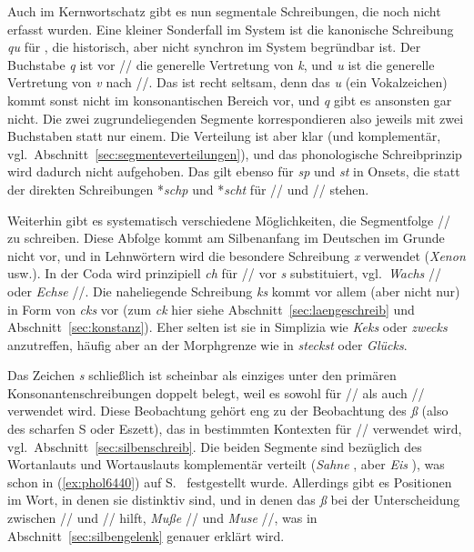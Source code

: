 Auch im Kernwortschatz gibt es nun segmentale Schreibungen, die noch nicht erfasst wurden.
Eine kleiner Sonderfall im System ist die kanonische Schreibung \textit{qu} für \textipa{[kv]}, die historisch, aber nicht synchron im System begründbar ist.
Der Buchstabe \textit{q} ist vor // die generelle Vertretung von \textit{k}, und \textit{u} ist die generelle Vertretung von \textit{v} nach //.
Das ist recht seltsam, denn das \textit{u} (ein Vokalzeichen) kommt sonst nicht im konsonantischen Bereich vor, und \textit{q} gibt es ansonsten gar nicht.
Die zwei zugrundeliegenden Segmente korrespondieren also jeweils mit zwei Buchstaben statt nur einem.
Die Verteilung ist aber klar (und komplementär, vgl.\ Abschnitt~\ref{sec:segmenteverteilungen}), und das phonologische Schreibprinzip wird dadurch nicht aufgehoben.
Das gilt ebenso für \textit{sp} und \textit{st} in Onsets, die statt der direkten Schreibungen *\textit{schp} und *\textit{scht} für // und // stehen.

Weiterhin gibt es systematisch verschiedene Möglichkeiten, die Segmentfolge // zu schreiben.
Diese Abfolge kommt am Silbenanfang im Deutschen im Grunde nicht vor, und in Lehnwörtern wird die besondere Schreibung \textit{x} verwendet (\textit{Xenon} usw.).
In der Coda wird prinzipiell \textit{ch} für // vor \textit{s} substituiert, vgl.\ \textit{Wachs} // oder \textit{Echse} //.
Die naheliegende Schreibung \textit{ks} kommt vor allem (aber nicht nur) in Form von \textit{cks} vor (zum \textit{ck} hier siehe Abschnitt~\ref{sec:laengeschreib} und Abschnitt~\ref{sec:konstanz}).
Eher selten ist sie in Simplizia wie \textit{Keks} oder \textit{zwecks} anzutreffen, häufig aber an der Morphgrenze wie in \textit{steckst} oder \textit{Glücks}.

Das Zeichen \textit{s} schließlich ist scheinbar als einziges unter den primären Konsonantenschreibungen doppelt belegt, weil es sowohl für // als auch // verwendet wird.
Diese Beobachtung gehört eng zu der Beobachtung des \textit{ß} (also des scharfen S oder Eszett), das in bestimmten Kontexten für // verwendet wird, vgl.\ Abschnitt~\ref{sec:silbenschreib}.
Die beiden Segmente sind bezüglich des Wortanlauts und Wortauslauts komplementär verteilt (\textit{Sahne} \textipa{[za:n@]}, aber \textit{Eis} \textipa{[P\t{aE}s]}), was schon in (\ref{ex:phol6440}) auf S.~\pageref{ex:phol6440} festgestellt wurde.
Allerdings gibt es Positionen im Wort, in denen sie distinktiv sind, und in denen das \textit{ß} bei der Unterscheidung zwischen // und // hilft, \zB \textit{Muße} // und \textit{Muse} //, was in Abschnitt~\ref{sec:silbengelenk} genauer erklärt wird.

